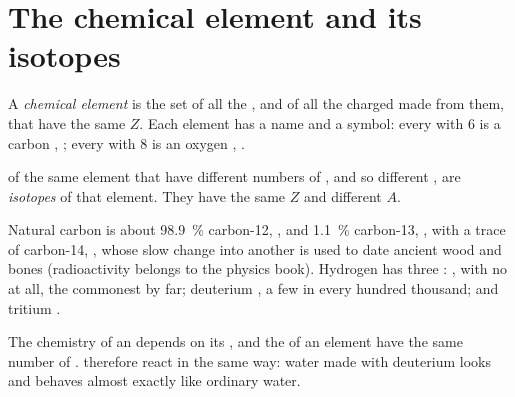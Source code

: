 \section{The chemical element and its isotopes}

\begin{definition}\label{def:g9:inside-the-atom:element}
A \emph{chemical element} is the set of all the
, and of all the charged  made from them, that have the same
 $Z$. Each element has a name and a symbol: every  with
6  is a carbon , ; every  with 8  is an
oxygen , .
\end{definition}

\begin{definition}[Isotopes]\label{def:g9:inside-the-atom:isotope}
 of the same element that have different numbers of , and
so different , are \emph{isotopes} of that
element. They have the same $Z$ and different $A$.
\end{definition}

\begin{example}\label{ex:g9:inside-the-atom:isotopes}
Natural carbon is about \qty{98.9}{\percent} carbon-12, ,
and \qty{1.1}{\percent} carbon-13, , with a trace of
carbon-14, , whose slow change into another  is
used to date ancient wood and bones (radioactivity belongs to the
physics book). Hydrogen has three : , with no
 at all, the commonest by far; deuterium , a few
 in every hundred thousand; and tritium .
\end{example}

\begin{proposition}\label{prop:g9:inside-the-atom:alike}
The chemistry of an  depends on its , and the  of
an element have the same number of .  therefore react
in the same way: water made with deuterium looks and behaves almost
exactly like ordinary water.
\end{proposition}

